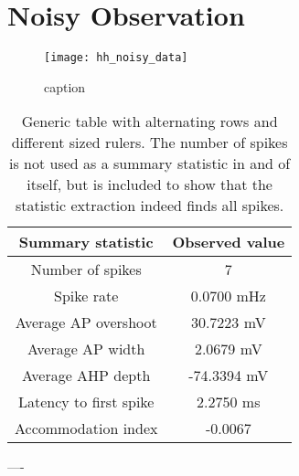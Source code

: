 


\section{Noisy Observation}

\begin{figure}[H]
    \centering
    \texttt{[image: hh\_noisy\_data]}
    \caption{caption}
    \label{fig:fig1}
\end{figure} 


\begin{table}[H]
  \caption{Generic table with alternating rows and different sized rulers. The number of spikes is not used as a summary statistic in and of itself, but is included to show that the statistic extraction indeed finds all spikes.}
  \begin{center}
    \begin{tabular}{cc}
      \toprule
      \textbf{Summary statistic} & \textbf{Observed value} \\
      \midrule
      Number of spikes &  7 \\
      Spike rate &  0.0700 mHz \\
      Average AP overshoot & 30.7223 mV  \\
      Average AP width & 2.0679 mV \\
      Average AHP depth & -74.3394 mV \\
      Latency to first spike & 2.2750 ms \\
      Accommodation index &  -0.0067 \\
      \bottomrule
    \end{tabular}
  \end{center}
  \label{tab:hh_noisy_sumstats}
\end{table}



----

